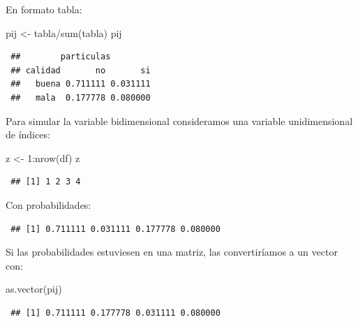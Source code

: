 \documentclass[
  10pt,
]{book}
\newenvironment{Shaded}{\begin{snugshade}}{\end{snugshade}}
\newcommand{\DecValTok}[1]{\textcolor[rgb]{0.00,0.00,0.81}{#1}}
\newcommand{\FunctionTok}[1]{\textcolor[rgb]{0.00,0.00,0.00}{#1}}
\newcommand{\NormalTok}[1]{#1}
\newcommand{\OtherTok}[1]{\textcolor[rgb]{0.56,0.35,0.01}{#1}}
\newcommand{\SpecialCharTok}[1]{\textcolor[rgb]{0.00,0.00,0.00}{#1}}
\theoremstyle{break}
\theoremstyle{nonumberplain}
\begin{document}
En formato tabla:

\begin{Shaded}
\begin{Highlighting}[]
\NormalTok{pij }\OtherTok{\textless{}{-}}\NormalTok{ tabla}\SpecialCharTok{/}\FunctionTok{sum}\NormalTok{(tabla)}
\NormalTok{pij}
\end{Highlighting}
\end{Shaded}

\begin{verbatim}
 ##        particulas
 ## calidad       no       si
 ##   buena 0.711111 0.031111
 ##   mala  0.177778 0.080000
\end{verbatim}

Para simular la variable bidimensional consideramos una variable unidimensional de índices:

\begin{Shaded}
\begin{Highlighting}[]
\NormalTok{z }\OtherTok{\textless{}{-}} \DecValTok{1}\SpecialCharTok{:}\FunctionTok{nrow}\NormalTok{(df)}
\NormalTok{z}
\end{Highlighting}
\end{Shaded}

\begin{verbatim}
 ## [1] 1 2 3 4
\end{verbatim}

Con probabilidades:

\begin{Shaded}
\end{Shaded}

\begin{verbatim}
 ## [1] 0.711111 0.031111 0.177778 0.080000
\end{verbatim}

Si las probabilidades estuviesen en una matriz, las convertiríamos a un vector con:

\begin{Shaded}
\begin{Highlighting}[]
\FunctionTok{as.vector}\NormalTok{(pij)}
\end{Highlighting}
\end{Shaded}

\begin{verbatim}
 ## [1] 0.711111 0.177778 0.031111 0.080000
\end{verbatim}
\end{document}
